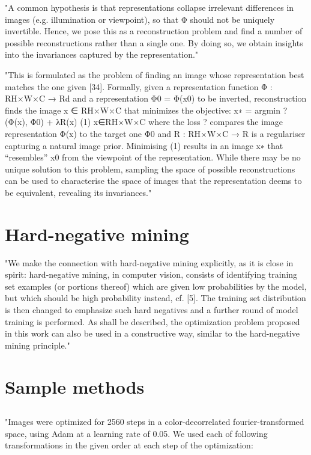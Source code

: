 \documentclass[]{scrartcl}
\begin{document}
"A common hypothesis is that representations collapse irrelevant differences in images (e.g. illumination or viewpoint), so that Φ should not be uniquely invertible.
Hence, we pose this as a reconstruction problem and find a number of possible reconstructions rather than a single one. By doing so, we obtain insights into the invariances captured by the representation." \cite{Mahendran2015}

"This is formulated as the problem of finding an image whose representation best matches the one given [34]. Formally, given a representation function Φ : RH×W×C → Rd and a representation Φ0 = Φ(x0) to be inverted, reconstruction finds the image x ∈ RH×W×C that minimizes the objective: x∗ = argmin ?(Φ(x), Φ0) + λR(x) (1) x∈RH×W×C
where the loss ? compares the image representation Φ(x) to the target one Φ0 and R : RH×W×C → R is a regulariser capturing a natural image prior. Minimising (1) results in an image x∗ that “resembles”
x0 from the viewpoint of the representation. While there may be no unique solution to this problem, sampling the space of possible reconstructions can be used to characterise the space of images that the representation deems to be equivalent, revealing its invariances." \cite{Mahendran2015}

\section{Hard-negative mining}

"We make the connection with hard-negative mining explicitly, as it is close in spirit: hard-negative mining, in computer vision, consists of identifying training set examples (or portions thereof) which are given low probabilities by the model, but which should be high probability instead, cf. [5]. The training set distribution is then changed to emphasize such hard negatives and a further round of model training is performed. As shall be described, the optimization problem proposed in this work can also be used in a constructive way, similar to the hard-negative mining principle." \cite{Szegedy2013}

\section{Sample methods}
\subsection{\cite{Olah2017}}
"Images were optimized for 2560 steps in a color-decorrelated fourier-transformed space, using Adam at a learning rate of 0.05. We used each of following transformations in the given order at each step of the optimization:
\end{document}
